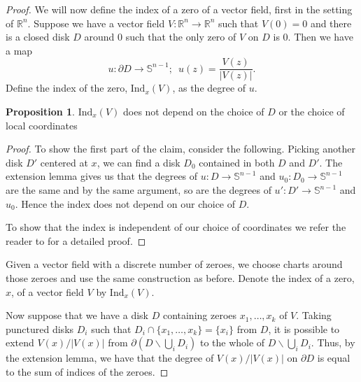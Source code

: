 \documentclass[12pt,a4paper]{article}
\numberwithin{equation}{section}
\theoremstyle{definition}
\newtheorem{proposition}{Proposition}[section]
\theoremstyle{remark}
\begin{document}
\begin{proof}
%
%
We will now define the index of a zero of a vector field, first in the setting of $\mathbb{R}^n$. Suppose we have a vector field $V:\mathbb{R}^n\to\mathbb{R}^n$ such that $V(0)=0$ and there is a closed disk $D$ around 0 such that the only zero of $V$ on $D$ is 0. Then we have a map \[u:\partial D\to\mathbb{S}^{n-1};\,\,\, u(z)=\frac{V(z)}{|V(z)|}.\] Define the index of the zero, $\mathrm{Ind}_x(V)$, as the degree of $u$.

\begin{proposition}
$\mathrm{Ind}_x(V)$ does not depend on the choice of $D$ or the choice of local coordinates
\end{proposition}
\begin{proof}
To show the first part of the claim, consider the following. Picking another disk $D'$ centered at $x$, we can find a disk $D_0$ contained in both $D$ and $D'$. The extension lemma gives us that the degrees of $u:D\to\mathbb{S}^{n-1}$ and $u_0:D_0\to\mathbb{S}^{n-1}$ are the same and by the same argument, so are the degrees of $u':D'\to\mathbb{S}^{n-1}$ and $u_0$. Hence the index does not depend on our choice of $D$.

To show that the index is independent of our choice of coordinates we refer the reader to \cite{BurnsGidea} for a detailed proof.

\end{proof}

Given a vector field with a discrete number of zeroes, we choose charts around those zeroes and use the same construction as before. Denote the index of a zero, $x$, of a vector field $V$ by $\mathrm{Ind}_x(V)$.

Now suppose that we have a disk $D$ containing zeroes $x_1,\ldots,x_k$ of $V$. Taking punctured disks $D_i$ such that $D_i\cap\{x_1,\ldots,x_k\}=\{x_i\}$ from $D$, it is possible to extend $V(x)/|V(x)|$ from $\partial(D\backslash\bigcup_iD_i)$ to the whole of $D\backslash\bigcup_iD_i$. Thus, by the extension lemma, we have that the degree of $V(x)/|V(x)|$ on $\partial D$ is equal to the sum of indices of the zeroes.


\end{proof}
\end{document}
